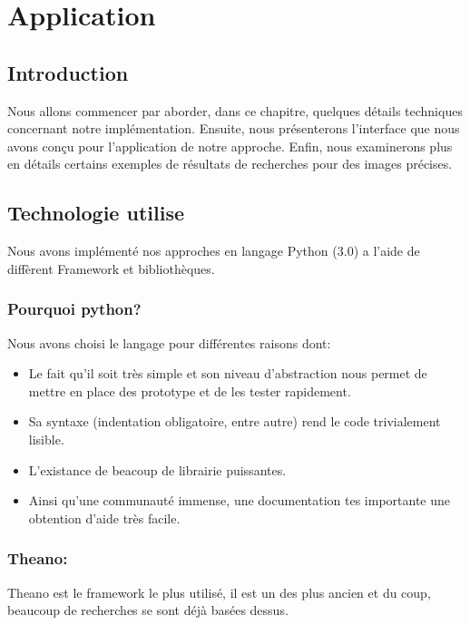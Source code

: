
\chapter{Application} %

\section{Introduction}
Nous allons commencer par aborder, dans ce chapitre, quelques détails techniques concernant notre implémentation. Ensuite, nous présenterons l'interface que nous avons conçu pour l'application de notre approche. Enfin, nous examinerons plus en détails certains exemples de résultats de recherches pour des images précises.

\section{Technologie utilise}

Nous avons implémenté nos approches en langage Python (3.0) a l'aide de diffèrent Framework et bibliothèques.

\subsection{Pourquoi python?}
Nous avons choisi le langage pour différentes raisons dont:

\begin{itemize}
\item Le fait qu'il soit très simple et son niveau d'abstraction nous permet de mettre en place des prototype et de les tester rapidement.

\item Sa syntaxe (indentation obligatoire, entre autre) rend le code trivialement lisible.

\item L'existance de beacoup de librairie puissantes.

\item Ainsi qu'une communauté immense, une documentation tes importante une obtention d'aide très facile.
\end{itemize}


\subsection{Theano:}
Theano est le framework le plus utilisé, il est un des plus ancien et du coup, beaucoup de recherches se sont déjà basées dessus. 

